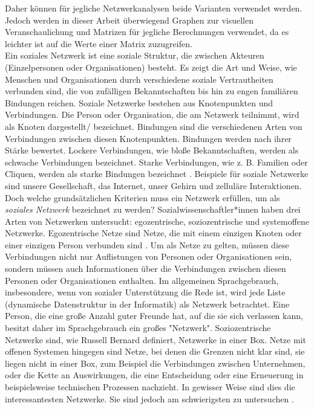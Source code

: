 Daher können für jegliche Netzwerkanalysen beide Varianten verwendet werden. Jedoch werden in dieser Arbeit überwiegend Graphen zur visuellen Veranschaulichung und Matrizen für jegliche Berechnungen verwendet, da es leichter ist auf die Werte einer Matrix zuzugreifen.\\

Ein soziales Netzwerk ist eine soziale Struktur, die zwischen Akteuren (Einzelpersonen oder Organisationen) besteht. Es zeigt die Art und Weise, wie Menschen und Organisationen durch verschiedene soziale Vertrautheiten verbunden sind, die von zufälligen Bekanntschaften bis hin zu engen familiären Bindungen reichen. Soziale Netzwerke bestehen aus Knotenpunkten und Verbindungen. Die Person oder Organisation, die am Netzwerk teilnimmt, wird als Knoten dargestellt/ bezeichnet. Bindungen sind die verschiedenen Arten von Verbindungen zwischen diesen Knotenpunkten. Bindungen werden nach ihrer Stärke bewertet. Lockere Verbindungen, wie bloße Bekanntschaften, werden als schwache Verbindungen bezeichnet. Starke Verbindungen, wie z. B. Familien oder Cliquen, werden als starke Bindungen bezeichnet \cite{SNADefinition}. Beispiele für soziale Netzwerke sind unsere Gesellschaft, das Internet, unser Gehirn und zelluläre Interaktionen.
Doch welche grundsätzlichen Kriterien muss ein Netzwerk erfüllen, um als \textit{soziales Netzwerk} bezeichnet zu werden? 
Sozialwissenschaftler*innen haben drei Arten von Netzwerken untersucht: egozentrische, soziozentrische und systemoffene
Netzwerke. Egozentrische Netze sind Netze, die mit einem einzigen Knoten oder einer einzigen Person verbunden sind \cite{egocentric}. Um als Netze zu gelten, müssen diese Verbindungen nicht nur Auflistungen von Personen oder Organisationen sein, sondern müssen auch Informationen über die Verbindungen zwischen diesen Personen oder Organisationen enthalten. Im allgemeinen Sprachgebrauch, insbesondere, wenn von sozialer Unterstützung die Rede ist, wird jede Liste (dynamische Datenstruktur in der Informatik) als Netzwerk betrachtet. Eine Person, die eine große Anzahl guter Freunde hat, auf die sie sich verlassen kann, besitzt daher im Sprachgebrauch ein großes "Netzwerk". Soziozentrische Netzwerke sind, wie Russell Bernard definiert, Netzwerke in einer Box. Netze mit offenen Systemen hingegen sind Netze, bei denen die Grenzen nicht klar sind, sie liegen nicht in einer Box, zum Beispiel die Verbindungen zwischen Unternehmen, oder die Kette an Auswirkungen, die eine Entscheidung oder eine Erneuerung in beispielsweise technischen Prozessen nachzieht. In gewisser Weise sind dies die interessantesten Netzwerke. Sie sind jedoch am schwierigsten zu untersuchen \cite{charlesKadushin}. 




